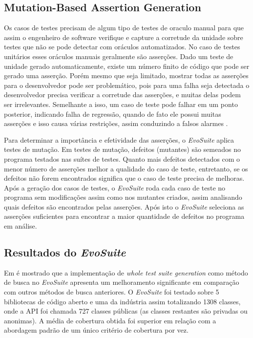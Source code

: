 \documentclass[conference]{IEEEtran}
\begin{document}
\subsection{Mutation-Based Assertion Generation}

Os casos de testes precisam de algum tipo de testes de oraculo manual para que assim o engenheiro de software verifique e capture a corretude da unidade sobre testes que não se pode detectar com oráculos automatizados. No caso de testes unitários esses oráculos manuais geralmente são asserções. Dado um teste de unidade gerado automaticamente, existe um número finito de código que pode ser gerado uma asserção. Porém mesmo que seja limitado, mostrar todas as asserções para o desenvolvedor pode ser problemático, pois para uma falha seja detectada o desenvolvedor precisa verificar a corretude das asserções, e muitas delas podem ser irrelevantes. Semelhante a isso, um caso de teste pode falhar em um ponto posterior, indicando falha de regressão, quando de fato ele possui muitas asserções e isso causa várias restrições, assim conduzindo a falsos alarmes \cite{fraser2011evosuite}.

Para determinar a importância e efetividade das asserções, o \textit{EvoSuite} aplica testes de mutação. Em testes de mutação, defeitos (mutantes) são semeados no programa testados nas suítes de testes. Quanto mais defeitos detectados com o menor número de asserções melhor a qualidade do caso de teste, entretanto, se os defeitos não forem encontrados significa que o caso de teste precisa de melhoras. Após a geração dos casos de testes, o \textit{EvoSuite} roda cada caso de teste no programa sem modificações assim como nos mutantes criados, assim analisando quais defeitos são encontrados pelas asserções. Após isto o \textit{EvoSuite} seleciona as asserções suficientes para encontrar a maior quantidade de defeitos no programa em análise.

\subsection{Resultados do \textit{EvoSuite}}

Em \cite{fraser2011evolutionary} é mostrado que a implementação de \textit{whole test suite generation} como método de busca no \textit{EvoSuite} apresenta um melhoramento significante em comparação com outros métodos de busca anteriores. O \textit{EvoSuite} foi testado sobre 5 bibliotecas de código aberto e uma da indústria assim totalizando 1308 classes, onde a API foi chamada 727 classes públicas (as classes restantes são privadas ou anonimas). A média de cobertura obtida foi superior em relação com a abordagem padrão de um único critério de cobertura por vez.
\end{document}
